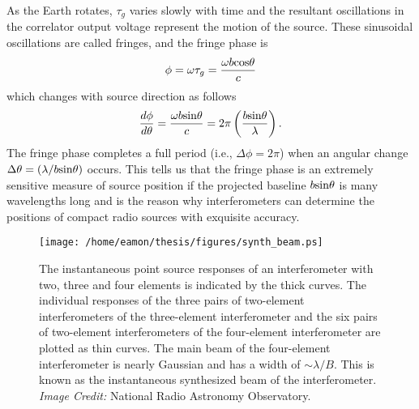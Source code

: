 As the Earth rotates, $\tau _g$ varies slowly with time and the resultant oscillations in the correlator output voltage represent the motion of the source. These sinusoidal oscillations are called fringes, and the fringe phase is 
\begin{equation}
\phi = \omega \tau _g = \frac{\omega b\rm{cos} \theta}{c}
\end{equation}
which changes with source direction as follows
\begin{equation}
\frac{d\phi}{d\theta}= \frac{\omega b\rm{sin} \theta}{c}=2\pi\left(\frac{b\rm{sin}\theta}{\lambda}\right).
\end{equation}
The fringe phase completes a full period (i.e., $\Delta \phi=2\pi$) when an angular change $\Delta \theta=(\lambda/b\rm{sin}\theta)$ occurs. This tells us that the fringe phase is an extremely sensitive measure of source position if the projected baseline $b\rm{sin}\theta$ is many wavelengths long and is the reason why interferometers can determine the positions of compact radio sources with exquisite accuracy.

\begin{figure}[hbt!]
\centering 
          \texttt{[image: /home/eamon/thesis/figures/synth\_beam.ps]}
\caption[The instantaneous point source responses of an interferometer.]{The instantaneous point source responses of an interferometer with two, three and four elements is indicated by the thick curves. The individual responses of the three pairs of two-element interferometers of the three-element interferometer and the six pairs of two-element interferometers of the four-element interferometer are plotted as thin curves. The main beam of the four-element interferometer is nearly Gaussian and has a width of $\sim \lambda /B$. This is known as the instantaneous synthesized beam of the interferometer. \textit{Image Credit:} National Radio Astronomy Observatory.}
\label{fig2.7}
\end{figure}

